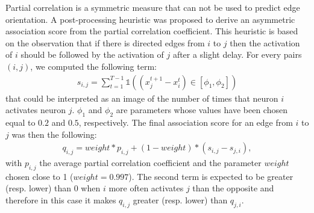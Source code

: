 \documentclass[wcp]{jmlr}
\begin{document}
Partial correlation is a symmetric measure that can not be used to predict edge
orientation. A post-processing heuristic was proposed to derive an asymmetric
association score from the partial correlation coefficient. This heuristic is
based on the observation that if there is directed edges from $i$ to $j$ then
the activation of $i$ should be followed by the activation of $j$ after a
slight delay. For every pairs $(i,j)$, we computed the following term:
\begin{align}
s_{i,j} = \sum_{t=1}^{T - 1} \mathbb{1}((x_j^{t+1} - x_i^t) \in \left[\phi_1, \phi_2\right])
\end{align}
that could be interpreted as an image of the number of times that neuron $i$
activates neuron $j$. $\phi_1$ and $\phi_2$ are parameters whose values have
been chosen equal to $0.2$ and $0.5$, respectively. The
final association score for an edge from $i$ to $j$ was
then the following:
\begin{align}
q_{i,j} = weight * p_{i,j} + (1-weight) * (s_{i,j}-s_{j,i}),
\label{eqn:qij}
\end{align}
with $p_{i,j}$ the average partial correlation coefficient and the parameter
$weight$ chosen close to 1 ($weight=0.997$). The second term is expected to be
greater (resp. lower) than 0 when $i$ more often activates $j$ than the
opposite and therefore in this case it makes $q_{i,j}$ greater (resp. lower)
than $q_{j,i}$.

\newpage

\end{document}
